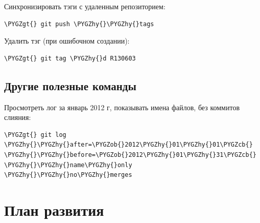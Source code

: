 \documentclass[a4paper,12pt,oneside]{sphinxmanual}
\def\PYGZob{\char`\{}
\def\PYGZcb{\char`\}}
\def\PYGZgt{\char`\>}
\def\PYGZhy{\char`\-}
\begin{document}
Синхронизировать тэги с удаленным репозиторием:

\begin{Verbatim}[commandchars=\\\{\}]
\PYGZgt{} git push \PYGZhy{}\PYGZhy{}tags
\end{Verbatim}

Удалить тэг (при ошибочном создании):

\begin{Verbatim}[commandchars=\\\{\}]
\PYGZgt{} git tag \PYGZhy{}d R130603
\end{Verbatim}


\section{Другие полезные команды}
\label{git_short_manual:id20}
Просмотреть лог за январь 2012 г, показывать имена файлов, без коммитов слияния:

\begin{Verbatim}[commandchars=\\\{\}]
\PYGZgt{} git log \PYGZhy{}\PYGZhy{}after=\PYGZob{}2012\PYGZhy{}01\PYGZhy{}01\PYGZcb{} \PYGZhy{}\PYGZhy{}before=\PYGZob{}2012\PYGZhy{}01\PYGZhy{}31\PYGZcb{} \PYGZhy{}\PYGZhy{}name\PYGZhy{}only \PYGZhy{}\PYGZhy{}no\PYGZhy{}merges
\end{Verbatim}


\chapter{План развития}
\label{roadmap:id1}\label{roadmap::doc}\label{roadmap:roadmap}
\end{document}
